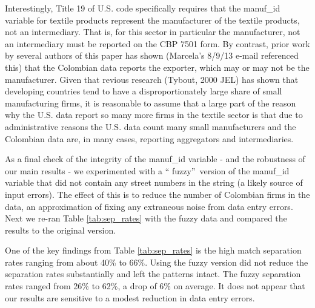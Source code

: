 \documentclass[12pt,titlepage]{article}
\begin{document}
Interestingly, Title 19 of U.S. code specifically requires that the
manuf\_id variable for textile products represent the manufacturer of the
textile products, not an intermediary. That is, for this sector in
particular the manufacturer, not an intermediary must be reported on the CBP
7501 form. By contrast, prior work by several authors of this paper has
shown (Marcela's 8/9/13 e-mail referenced this) that the Colombian data
reports the exporter, which may or may not be the manufacturer. Given that
revious research (Tybout, 2000 JEL) has shown that developing countries tend
to have a disproportionately large share of small manufacturing firms, it is
reasonable to assume that a large part of the reason why the U.S. data
report so many more firms in the textile sector is that due to
administrative reasons the U.S. data count many small manufacturers and the
Colombian data are, in many cases, reporting aggregators and intermediaries.

As a final check of the integrity of the manuf\_id variable - and the
robustness of our main results - we experimented with a \textquotedblleft
fuzzy\textquotedblright\ version of the manuf\_id variable that did not
contain any street numbers in the string (a likely source of input errors).
The effect of this is to reduce the number of Colombian firms in the data,
an approximation of fixing any extraneous noise from data entry errors. Next
we re-ran Table \ref{tab:sep_rates} with the fuzzy data and compared the results to the
original version.

One of the key findings from Table \ref{tab:sep_rates} is the high match separation rates
ranging from about 40\% to 66\%. Using the fuzzy version did not reduce the
separation rates substantially and left the patterns intact. The fuzzy
separation rates ranged from 26\% to 62\%, a drop of 6\% on average. It does
not appear that our results are sensitive to a modest reduction in data
entry errors.
 
\end{document}
